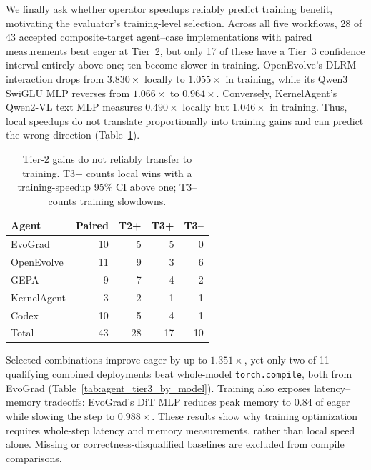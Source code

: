 We finally ask whether operator speedups reliably predict training benefit, motivating the evaluator's training-level selection. Across all five workflows, 28 of 43 accepted composite-target agent--case implementations with paired measurements beat eager at Tier~2, but only 17 of these have a Tier~3 confidence interval entirely above one; ten become slower in training. OpenEvolve's DLRM interaction drops from $3.830\times$ locally to $1.055\times$ in training, while its Qwen3 SwiGLU MLP reverses from $1.066\times$ to $0.964\times$. Conversely, KernelAgent's Qwen2-VL text MLP measures $0.490\times$ locally but $1.046\times$ in training. Thus, local speedups do not translate proportionally into training gains and can predict the wrong direction (Table~\ref{tab:tier_transfer_summary}).

\begin{table}[t]
\centering
\caption{Tier-2 gains do not reliably transfer to training. T3+ counts local wins with a training-speedup 95\% CI above one; T3-- counts training slowdowns.}

\label{tab:tier_transfer_summary}
\footnotesize
\setlength{\tabcolsep}{3pt}
\begin{tabular*}{\columnwidth}{@{\extracolsep{\fill}}lrrrr@{}}
\toprule
Agent & Paired & T2+ & T3+ & T3-- \\
\midrule
EvoGrad & 10 & 5 & 5 & 0 \\
OpenEvolve & 11 & 9 & 3 & 6 \\
GEPA & 9 & 7 & 4 & 2 \\
KernelAgent & 3 & 2 & 1 & 1 \\
Codex & 10 & 5 & 4 & 1 \\
\midrule
Total & 43 & 28 & 17 & 10 \\
\bottomrule
\end{tabular*}
\end{table}


Selected combinations improve eager by up to $1.351\times$, yet only two of 11 qualifying combined deployments beat whole-model \texttt{torch.compile}, both from EvoGrad (Table~\ref{tab:agent_tier3_by_model}). Training also exposes latency--memory tradeoffs: EvoGrad's DiT MLP reduces peak memory to $0.84$ of eager while slowing the step to $0.988\times$. These results show why training optimization requires whole-step latency and memory measurements, rather than local speed alone. Missing or correctness-disqualified baselines are excluded from compile comparisons.
